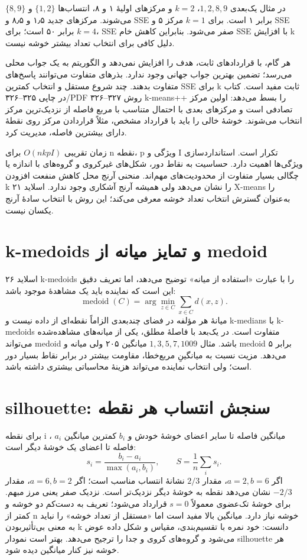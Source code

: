 \documentclass[12pt,a4paper,oneside]{report}
\begin{document}
در مثال یک‌بعدی \(1,2,8,9\)، $k=2$ و مرکزهای اولیهٔ ۱ و ۸، انتساب‌ها \(\{1,2\}\) و \(\{8,9\}\) می‌شوند. مرکزهای جدید ۱٫۵ و ۸٫۵ و SSE برابر ۱ است. برای $k=1$ مرکز ۵ و SSE برابر ۵۰ است؛ برای $k=4$، SSE صفر می‌شود. بنابراین کاهش خام SSE با افزایش k دلیل کافی برای انتخاب تعداد بیشتر خوشه نیست.

هر گام، با قراردادهای ثابت، هدف را افزایش نمی‌دهد و الگوریتم به یک جواب محلی می‌رسد؛ تضمین بهترین جواب جهانی وجود ندارد. بذرهای متفاوت می‌توانند پاسخ‌های متفاوت بدهند. چند شروع مستقل و انتخاب کمترین SSE برای k ثابت مفید است. کتاب در چاپی ۳۲۵--۳۲۶/PDF ۳۲۶--۳۲۷ روش k-means++ را بسط می‌دهد: اولین مرکز تصادفی است و مرکزهای بعدی با احتمال متناسب با مربع فاصله از نزدیک‌ترین مرکز انتخاب می‌شوند. خوشهٔ خالی را باید با قرارداد مشخص، مثلاً قراردادن مرکز روی نقطهٔ دارای بیشترین فاصله، مدیریت کرد.

زمان تقریبی \(O(nkpI)\) برای n نقطه، p ویژگی و I تکرار است. استانداردسازی ویژگی‌ها اهمیت دارد. حساسیت به نقاط دور، شکل‌های غیرکروی و گروه‌های با اندازه یا چگالی بسیار متفاوت از محدودیت‌های مهم‌اند. منحنی آرنج محل کاهش منفعت افزودن k را نشان می‌دهد ولی همیشه آرنج آشکاری وجود ندارد. اسلاید ۲۱ X-means را به‌عنوان گسترش انتخاب تعداد خوشه معرفی می‌کند؛ این روش با انتخاب سادهٔ آرنج یکسان نیست.

\section{k-medoids و تمایز میانه از medoid}

اسلاید ۲۶ k-medoids را با عبارت «استفاده از میانه» توضیح می‌دهد، اما تعریف دقیق این است که نماینده باید یک مشاهدهٔ موجود باشد: \[
\operatorname{medoid}(C)=\arg\min_{z\in C}\sum_{x\in C}d(x,z).
\] میانهٔ هر مؤلفه در فضای چندبعدی الزاماً نقطه‌ای از داده نیست و k-medians با k-medoids متفاوت است. در یک‌بعد با فاصلهٔ مطلق، یکی از میانه‌های مشاهده‌شده می‌تواند medoid باشد. مثال \(1,3,5,7,1009\) میانگین ۲۰۵ ولی میانه و medoid برابر ۵ می‌دهد. مزیت نسبت به میانگینِ مربع‌خطا، مقاومت بیشتر در برابر نقاط بسیار دور است؛ ولی انتخاب نماینده می‌تواند هزینهٔ محاسباتی بیشتری داشته باشد.

\section{silhouette: سنجش انتساب هر نقطه}

برای نقطه i ، \(a_i\) میانگین فاصله تا سایر اعضای خوشهٔ خودش و \(b_i\) کمترین میانگین فاصله تا اعضای یک خوشهٔ دیگر است: \[
s_i=\frac{b_i-a_i}{\max(a_i,b_i)},\qquad S=\frac1n\sum_i s_i.
\] اگر \(a=2,b=6\)، مقدار \(2/3\) نشانهٔ انتساب مناسب است؛ اگر \(a=6,b=2\)، مقدار \(-2/3\) نشان می‌دهد نقطه به خوشهٔ دیگر نزدیک‌تر است. نزدیک صفر یعنی مرز مبهم. برای خوشهٔ تک‌عضوی معمولاً $s=0$ قرارداد می‌شود؛ تعریف به دست‌کم دو خوشه و کمتر از n خوشه نیاز دارد. میانگین بالا مفید است اما «مستقل از تعداد خوشه» را نباید به معنی بی‌تأثیربودن k دانست: خود نمره با تقسیم‌بندی، مقیاس و شکل داده عوض می‌شود و گروه‌های کروی و جدا را ترجیح می‌دهد. بهتر است نمودار silhouette هر خوشه نیز کنار میانگین دیده شود.
\end{document}
